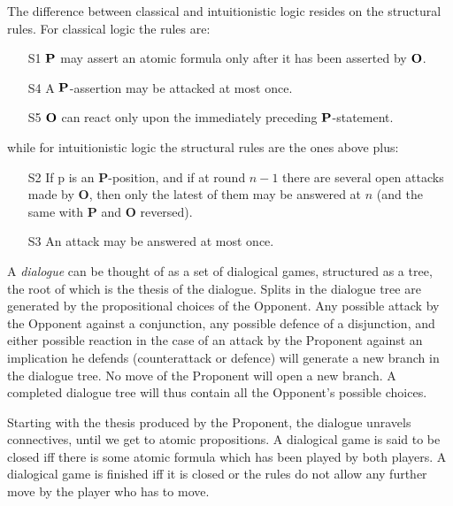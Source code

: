 \documentclass{article}
\begin{document}
The difference between classical and intuitionistic logic resides on
the structural rules.  For classical logic the rules are:
\begin{itemize}
\item[S1] $\bf P$ may assert an atomic formula only after it has been
  asserted by $\bf O$.  \iffalse
\item[S2] If p is an $\bf P$-position, and if at round $n - 1$ there
  are several open attacks made by $\bf O$, then only the latest of
  them may be answered at $n$ (and the same with $\bf P$ and $\bf O$
  reversed).
\item[S3] An attack may be answered at most once.
\fi
\item[S4] A $\bf P$-assertion may be attacked at most once.
\item[S5] $\bf O$ can react only upon the immediately preceding $\bf
  P$-statement.
\end{itemize}
while for intuitionistic logic the structural rules are the ones above
plus:
 \begin{itemize}
 \item[S2] If p is an {\bf P}-position, and if at round $n - 1$ there
   are several open attacks made by {\bf O}, then only the latest of
   them may be answered at $n$ (and the same with {\bf P} and {\bf O}
   reversed).
 \item[S3] An attack may be answered at most once.
\end{itemize}


A {\em dialogue} can be thought of as a set of dialogical games,
structured as a tree, the root of which is the thesis of the
dialogue. Splits in the dialogue tree are generated by the
propositional choices of the Opponent. Any possible attack by the
Opponent against a conjunction, any possible defence of a disjunction,
and either possible reaction in the case of an attack by the Proponent
against an implication he defends (counterattack or defence) will
generate a new branch in the dialogue tree. No move of the Proponent
will open a new branch. A completed dialogue tree will thus contain
all the Opponent's possible choices.

Starting with the thesis produced by the Proponent, the dialogue
unravels connectives, until we get to atomic propositions. A
dialogical game is said to be closed iff there is some atomic formula
which has been played by both players. A dialogical game is finished
iff it is closed or the rules do not allow any further move by the
player who has to move.
\end{document}
